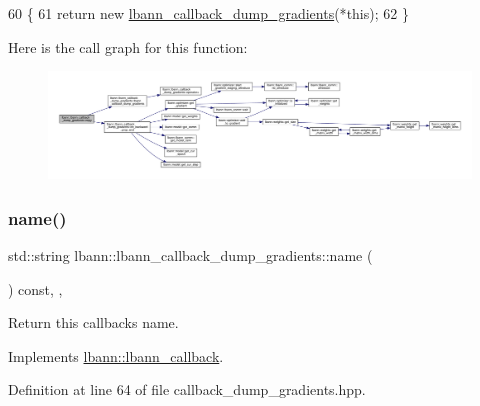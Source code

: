 \begin{DoxyCode}
60                                                        \{
61     \textcolor{keywordflow}{return} \textcolor{keyword}{new} \hyperlink{classlbann_1_1lbann__callback__dump__gradients_a321a8f673578f3a0535b9f8e27e3517a}{lbann\_callback\_dump\_gradients}(*\textcolor{keyword}{this});
62   \}
\end{DoxyCode}
Here is the call graph for this function\+:\nopagebreak
\begin{figure}[H]
\begin{center}
\leavevmode
\includegraphics[width=350pt]{classlbann_1_1lbann__callback__dump__gradients_a16b659f1d7e313c02a840be5173ebb38_cgraph}
\end{center}
\end{figure}
\mbox{\label{classlbann_1_1lbann__callback__dump__gradients_ae66a46b4835233c0a08c1fcc2fc9710d}} 
\subsubsection{\texorpdfstring{name()}{name()}}
{\footnotesize\ttfamily std\+::string lbann\+::lbann\+\_\+callback\+\_\+dump\+\_\+gradients\+::name (\begin{DoxyParamCaption}{ }\end{DoxyParamCaption}) const\hspace{0.3cm}{\ttfamily [inline]}, {\ttfamily [override]}, {\ttfamily [virtual]}}

Return this callback\textquotesingle{}s name. 

Implements \hyperlink{classlbann_1_1lbann__callback_a7522c7a14f1d6a1ea762cc2d7248eb3a}{lbann\+::lbann\+\_\+callback}.



Definition at line 64 of file callback\+\_\+dump\+\_\+gradients.\+hpp.


